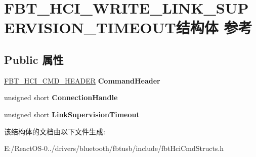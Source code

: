 \hypertarget{struct_f_b_t___h_c_i___w_r_i_t_e___l_i_n_k___s_u_p_e_r_v_i_s_i_o_n___t_i_m_e_o_u_t}{}\section{F\+B\+T\+\_\+\+H\+C\+I\+\_\+\+W\+R\+I\+T\+E\+\_\+\+L\+I\+N\+K\+\_\+\+S\+U\+P\+E\+R\+V\+I\+S\+I\+O\+N\+\_\+\+T\+I\+M\+E\+O\+U\+T结构体 参考}
\label{struct_f_b_t___h_c_i___w_r_i_t_e___l_i_n_k___s_u_p_e_r_v_i_s_i_o_n___t_i_m_e_o_u_t}
\subsection*{Public 属性}
\begin{DoxyCompactItemize}
\item 
\mbox{\label{struct_f_b_t___h_c_i___w_r_i_t_e___l_i_n_k___s_u_p_e_r_v_i_s_i_o_n___t_i_m_e_o_u_t_a53d3dbb2886cf50b94975e094302aa6a}} 
\hyperlink{struct_f_b_t___h_c_i___c_m_d___h_e_a_d_e_r}{F\+B\+T\+\_\+\+H\+C\+I\+\_\+\+C\+M\+D\+\_\+\+H\+E\+A\+D\+ER} {\bfseries Command\+Header}
\item 
\mbox{\label{struct_f_b_t___h_c_i___w_r_i_t_e___l_i_n_k___s_u_p_e_r_v_i_s_i_o_n___t_i_m_e_o_u_t_abc2bce9a5e63be80405d981f5d3b31e1}} 
unsigned short {\bfseries Connection\+Handle}
\item 
\mbox{\label{struct_f_b_t___h_c_i___w_r_i_t_e___l_i_n_k___s_u_p_e_r_v_i_s_i_o_n___t_i_m_e_o_u_t_a47a5a2be7a2f76a79cb275d7d986563d}} 
unsigned short {\bfseries Link\+Supervision\+Timeout}
\end{DoxyCompactItemize}


该结构体的文档由以下文件生成\+:\begin{DoxyCompactItemize}
\item 
E\+:/\+React\+O\+S-\/0../drivers/bluetooth/fbtusb/include/fbt\+Hci\+Cmd\+Structs.\+h\end{DoxyCompactItemize}
